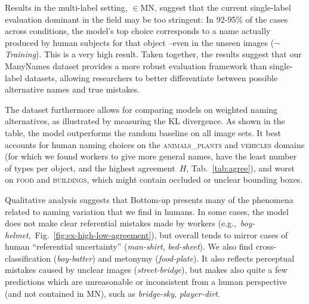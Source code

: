 Results in the multi-label setting, $\in$MN, suggest that the current single-label evaluation dominant in the field may be too stringent: In 92-95\% of the cases across conditions, the model's top choice corresponds to a name actually produced by human subjects for that object --even in the unseen images (\mbox{$\neg$\textit{Training}}).
This is a very high result.
Taken together, the results suggest that our ManyNames dataset provides a more robust evaluation framework than single-label datasets, allowing researchers to better differentiate between possible alternative names and true mistakes.

The dataset furthermore allows for comparing models on weighted naming alternatives, as illustrated by measuring the KL divergence. 
As shown in the table, the model outperforms the random baseline on all image sets. 
It best accounts for human naming choices on the \textsc{animals\_plants} and \textsc{vehicles} domains (for which we found workers to give more general names, have the least number of types per object, and the highest agreement\ $H$, Tab.\ \ref{tab:agree}), and worst on \textsc{food} and \textsc{buildings}, which might  contain occluded or unclear bounding boxes.%

Qualitative analysis suggests that Bottom-up presents many of the phenomena related to naming variation that we find in humans.
In some cases, the model does not make clear referential mistakes made by workers (e.g.,\ \textsl{boy-helmet},\ Fig.\ \ref{fig:ex-high-low-agreement}), but overall tends to mirror cases of human ``referential uncertainty'' 
(\textsl{man-shirt}, \textsl{bed-sheet}).
We also find cross-classification (\textsl{boy-batter}) and metonymy (\textsl{food-plate}). 
It also reflects perceptual mistakes caused by unclear images (\textit{street-bridge}), but makes also quite a few predictions which are unreasonable or inconsistent from a human perspective (and not contained in MN), such as \textsl{bridge-sky}, \textsl{player-dirt}. 

